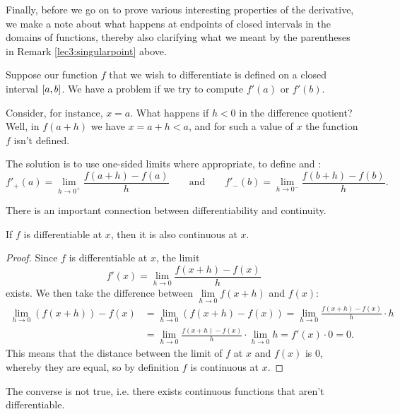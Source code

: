 Finally, before we go on to prove various interesting properties of the derivative, we make a note about what happens at endpoints of closed intervals in the domains of functions, thereby also clarifying what we meant by the parentheses in Remark \ref{lec3:singularpoint} above.

\begin{remark}
	Suppose our function $f$ that we wish to differentiate is defined on a closed interval $\interval{a}{b}$.
	We have a problem if we try to compute $f'(a)$ or $f'(b)$.

	Consider, for instance, $x = a$.
	What happens if $h < 0$ in the difference quotient?
	Well, in $f(a + h)$ we have $x = a + h < a$, and for such a value of $x$ the function $f$ isn't defined.

	The solution is to use one-sided limits where appropriate, to define  and :
	\[
		f'_+(a) = \lim_{h \to 0^+} \frac{f(a + h) - f(a)}{h} \qquad \text{and} \qquad f'_- (b) = \lim_{h \to 0^-} \frac{f(b + h) - f(b)}{h}.
	\]
\end{remark}

\noindent
There is an important connection between differentiability and continuity.

\begin{theorem}\label{lec3:diffimpliescont}
	If $f$ is differentiable at $x$, then it is also continuous at $x$.
\end{theorem}

\begin{proof}
	Since $f$ is differentiable at $x$, the limit
	\[
		f'(x) = \lim_{h \to 0} \frac{f(x + h) - f(x)}{h}
	\]
	exists. We then take the difference between $\lim\limits_{h \to 0} f(x + h)$ and $f(x)$:
	\begin{align*}
		\lim\limits_{h \to 0} (f(x + h)) - f(x) & = \lim_{h \to 0} (f(x + h) - f(x)) = \lim_{h \to 0} \frac{f(x + h) - f(x)}{h} \cdot h  \\
		                                        & = \lim_{h \to 0} \frac{f(x + h) - f(x)}{h} \cdot \lim_{h \to 0} h = f'(x) \cdot 0 = 0.
	\end{align*}
	This means that the distance between the limit of $f$ at $x$ and $f(x)$ is 0, whereby they are equal, so by definition $f$ is continuous at $x$.
\end{proof}

\noindent
The converse is not true, i.e. there exists continuous functions that aren't differentiable.

